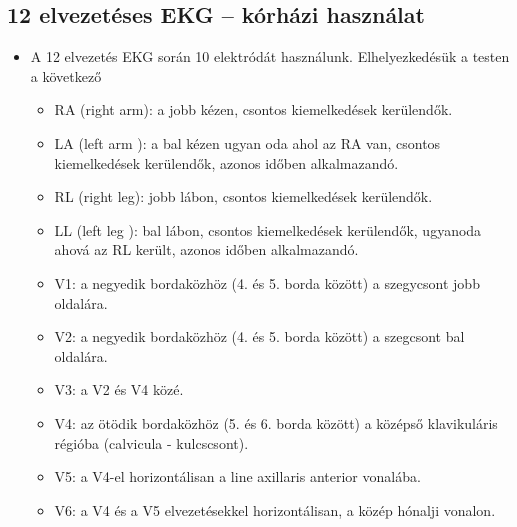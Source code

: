 \subsection{12 elvezetéses EKG – kórházi használat}
\begin{minipage}[t]{0.7\textwidth}
    \vspace{0pt}
    \begin{itemize}
        \item A 12 elvezetés EKG során 10 elektródát használunk. Elhelyezkedésük a
        testen a következő
        \begin{itemize}
            \item RA (right arm): a jobb kézen, csontos kiemelkedések kerülendők.
            \item LA (left arm ): a bal kézen ugyan oda ahol az RA van, csontos
            kiemelkedések kerülendők, azonos időben alkalmazandó.
            \item RL (right leg): jobb lábon, csontos kiemelkedések kerülendők.
            \item LL (left leg ): bal lábon, csontos kiemelkedések kerülendők,
            ugyanoda ahová az RL került, azonos időben alkalmazandó.
            \item V1: a negyedik bordaközhöz (4. és 5. borda között) a szegycsont
            jobb oldalára.
            \item V2: a negyedik bordaközhöz (4. és 5. borda között) a szegcsont bal
            oldalára.
            \item V3: a V2 és V4 közé.
            \item V4: az ötödik bordaközhöz (5. és 6. borda között) a középső
            klavikuláris régióba (calvicula - kulcscsont).
            \item V5: a V4-el horizontálisan a line axillaris anterior vonalába.
            \item V6: a V4 és a V5 elvezetésekkel horizontálisan, a közép hónalji
            vonalon.
        \end{itemize}
    \end{itemize}
\end{minipage}%
\hfill
\hspace{1cm}
\begin{minipage}[t]{0.3\textwidth}
    \vspace{0pt}
\end{minipage}

\clearpage
